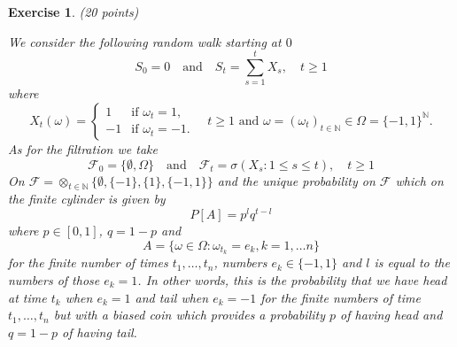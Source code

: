 \documentclass[DIV=classic,a4paper,10pt]{scrartcl}
\newtheorem{exercise}[theorem]{Exercise}
\theoremstyle{nonumberplain}
\newtheorem{proof}{Proof}
\numberwithin{equation}{section}
\begin{document}

    

\begin{exercise}(20 points)

We consider the following random walk starting at $0$
\begin{equation*}
    S_0=0\quad \text{and}\quad S_t=\sum_{s=1}^t X_s,\quad t\geq 1
\end{equation*}
where 
\begin{equation*}
    X_t(\omega)=
    \begin{cases}
        1&\text{if } \omega_t=1,\\
        -1&\text{if }\omega_t=-1.
    \end{cases}
    \quad t\geq 1\text{ and }\omega=(\omega_t)_{t\in \mathbb{N}} \in \Omega =\{-1,1\}^{\mathbb{N}}.
\end{equation*}
As for the filtration we take
\begin{equation*}
    \mathcal{F}_0=\{\emptyset,\Omega\}\quad \text{and}\quad \mathcal{F}_t=\sigma(X_s\colon 1\leq s\leq t),\quad t\geq 1
\end{equation*}
On $\mathcal{F}=\otimes_{t \in \mathbb{N}} \{\emptyset, \{-1\},\{1\},\{-1,1\}\}$ and the unique probability on $\mathcal{F}$ which on the finite cylinder is given by
\begin{equation*}
    P[A]=p^lq^{t-l}
\end{equation*}
where $p\in [0,1]$, $q=1-p$ and
\begin{equation*}
    A=\{\omega \in \Omega\colon \omega_{t_k}=e_k, k=1,\ldots n\}
\end{equation*}
for the finite number of times $t_1,\ldots, t_n$, numbers $e_k\in \{-1,1\}$ and $l$ is equal to the numbers of those $e_k=1$.
In other words, this is the probability that we have head at time $t_k$ when $e_k=1$ and tail when $e_k=-1$ for the finite numbers of time $t_1,\ldots, t_n$ but with a biased coin which provides a probability $p$ of having head and $q=1-p$ of having tail.


\end{exercise}
\end{document}

